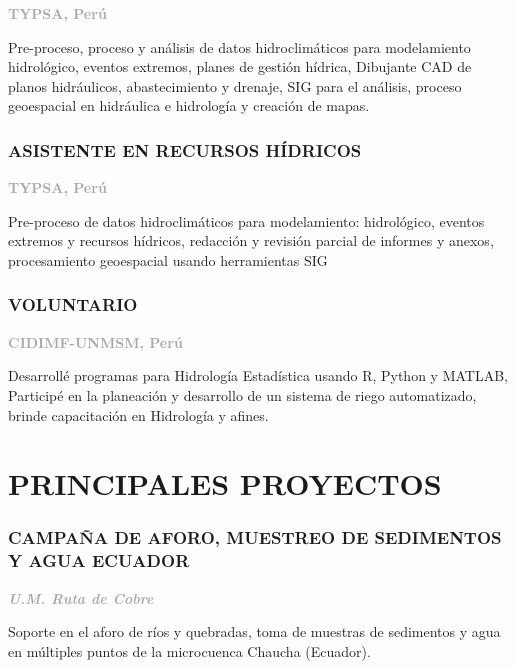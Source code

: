 \documentclass[
  10,
]{article}
\begin{document}
\textcolor{darkgray}{\textbf{TYPSA, Perú}}

Pre-proceso, proceso y análisis de datos hidroclimáticos para
modelamiento hidrológico, eventos extremos, planes de gestión hídrica,
Dibujante CAD de planos hidráulicos, abastecimiento y drenaje, SIG para
el análisis, proceso geoespacial en hidráulica e hidrología y creación
de mapas.

\hypertarget{asistente-en-recursos-huxeddricos}{%
\subsubsection{ASISTENTE EN RECURSOS
HÍDRICOS}\label{asistente-en-recursos-huxeddricos}}

\textcolor{darkgray}{\textbf{TYPSA, Perú}}

Pre-proceso de datos hidroclimáticos para modelamiento: hidrológico,
eventos extremos y recursos hídricos, redacción y revisión parcial de
informes y anexos, procesamiento geoespacial usando herramientas SIG

\hypertarget{voluntario}{%
\subsubsection{VOLUNTARIO}\label{voluntario}}

\textcolor{darkgray}{\textbf{CIDIMF-UNMSM, Perú}}

Desarrollé programas para Hidrología Estadística usando R, Python y
MATLAB, Participé en la planeación y desarrollo de un sistema de riego
automatizado, brinde capacitación en Hidrología y afines.

\hypertarget{principales-proyectos}{%
\section{PRINCIPALES PROYECTOS}\label{principales-proyectos}}

\hypertarget{campauxf1a-de-aforo-muestreo-de-sedimentos-y-agua-ecuador}{%
\subsubsection{CAMPAÑA DE AFORO, MUESTREO DE SEDIMENTOS Y AGUA
\textbar{}
ECUADOR}\label{campauxf1a-de-aforo-muestreo-de-sedimentos-y-agua-ecuador}}

\textcolor{darkgray}{\textbf{\emph{U.M. Ruta de Cobre}}}

Soporte en el aforo de ríos y quebradas, toma de muestras de sedimentos
y agua en múltiples puntos de la microcuenca Chaucha (Ecuador).
\end{document}
